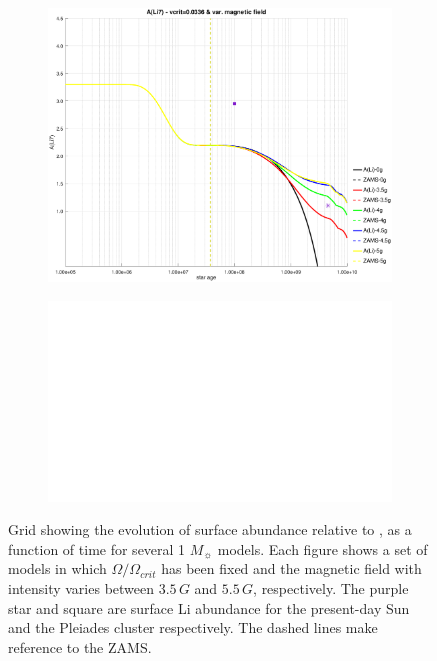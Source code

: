 \documentclass[fleqn,usenatbib]{mnras}
\begin{document}
\begin{figure}
\begin{subfigure}[h]{0.47\textwidth}
    \includegraphics[trim = 40mm 15mm 15mm 15mm, clip,width=\textwidth]{figures/li_vc_0336_var_g.eps}
    \label{fig:subim25}
    \end{subfigure}
    \begin{subfigure}[h]{0.47\textwidth}
    \includegraphics[width=\textwidth]{figures/blank.eps}
    \label{fig:subim26}
    \end{subfigure}
\caption{Grid showing the evolution of surface  abundance relative to , as a function of time for several 1 $M_{\sun}$ models. Each figure shows a set of models in which $\Omega / \Omega_{crit}$ has been fixed and the magnetic field with intensity varies between $3.5\,G$ and $5.5\,G$, respectively. The purple star and square are surface Li abundance for the present-day Sun \citep{Asplund2009} and the Pleiades cluster \citep{Sestito2005} respectively. The dashed lines make reference to the ZAMS.}
\label{fig:image22}
\end{figure}
\end{document}
